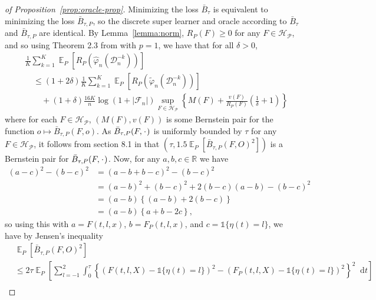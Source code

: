 \documentclass[lineno]{biometrika}
\DeclareMathOperator{\E}{\mathbb{E}} %
\newcommand{\R}{\mathbb{R}}
\newcommand{\blank}{\makebox[1ex]{\textbf{$\cdot$}}}
\renewcommand{\phi}{\varphi}
\newcommand*\diff{\mathop{}\!\mathrm{d}}
\newcommand{\1}{\mathds{1}}
\newcommand{\data}{\ensuremath{\mathcal{D}}}
\begin{document}
\begin{proof}[of Proposition~\ref{prop:oracle-prop}]
  Minimizing the loss \( \bar{B}_{\tau} \) is equivalent to
  minimizing the loss \( \bar{B}_{\tau,P} \), so the discrete super learner and
  oracle according to \( \bar{B}_{\tau} \) and \( \bar{B}_{\tau,P} \) are
  identical. By Lemma~\ref{lemma:norm}, \( R_P(F) \geq 0 \) for any
  \( F \in \mathcal{H}_{\mathcal{P}} \), and so using Theorem 2.3 from
  \citep{vaart2006oracle} with \( p=1 \), we have that for all \( \delta >0 \),
\begin{align*}
  & \frac{1}{K} \sum_{k=1}^{K} \E_{P}{\left[ R_P(\hat{\phi}_n(\data_n^{-k})) \right]}
  \\
  &  \quad \leq
    (1+2\delta)\frac{1}{K} \sum_{k=1}^{K}\E_{P}{\left[ R_P(\tilde{\phi}_n(\data_n^{-k})) \right]}
  \\
  & \qquad + (1+\delta) \frac{16 K}{n}
    \log(1 + |\mathcal{F}_n|)\sup_{F \in \mathcal{H}_{\mathcal{P}}}
    \left\{
    M(F) + \frac{v(F)}{R_P(F)}
    \left(
    \frac{1}{\delta} + 1
    \right)
    \right\}
\end{align*}
where for each \( F \in \mathcal{H}_{\mathcal{P}} \),
\( (M(F), v(F)) \) is some Bernstein pair for the function
\(o \mapsto \bar{B}_{\tau,P}(F, o) \). As
\( \bar{B}_{\tau,P}(F, \blank) \) is uniformly bounded by \( \tau \)
for any \( F \in \mathcal{H}_{\mathcal{P}} \), it follows from section
8.1 in \citep{vaart2006oracle} that
\( (\tau, 1.5 \E_P{[\bar{B}_{\tau,P}(F, O)^2]}) \) is a Bernstein
pair for \( \bar{B}_{\tau,P}(F, \blank) \). Now, for any
\( a,b,c \in \R \) we have
\begin{align*}
  (a-c)^2 - (b-c)^2
  & = (a-b+b-c)^2 - (b-c)^2
  \\
  & = (a-b)^2 + (b-c)^2 +2(b-c)(a-b) - (b-c)^2
  \\
  & = (a-b)
    \left\{
    (a-b) +  2(b-c)
    \right\}
  \\
  & = (a-b)
    \left\{
     a + b -2c
    \right\},
\end{align*}
so using this with \( a=F(t, l, x) \), \( b=F_P(t, l, x) \), and
\( c = \1{\{\eta(t) = l\}} \), we have by Jensen's inequality
\begin{align*}
  & \E_P{[\bar{B}_{\tau,P}(F, O)^2]}
  \\
  & \leq
    2\tau\E_{P}{\left[
    \sum_{l=-1}^{2} \int_0^{\tau}
    \left\{
    \left(
    F(t, l, X) - \1{\{\eta(t) = l\}}
    \right)^2
    -
    \left(
    F_P(t, l, X) - \1{\{\eta(t) = l\}}
    \right)^2
    \right\}^2
    \diff t 
    \right]}
  \\

\end{align*}
\end{proof}
\end{document}
